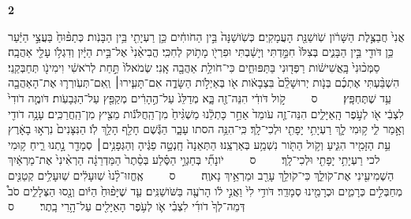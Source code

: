 \documentclass[a4paper]{article}
\newcommand{\rdrchap}[1]{\begin{english}\setRL\small\textbf{#1}\end{english}}
\newcommand{\rdrverse}[1]{\raisebox{2.5pt}{\smaller[4]#1}}
\newcommand{\setuma}{~~~~{\scriptsize ס}~~~~}
\begin{document}
\begin{hebrew}
\begin{multicols}{2}
\rdrchap{2}\rdrverse{1} אֲנִי֙ חֲבַצֶּ֣לֶת הַשָּׁרֹ֔ון שֹֽׁושַׁנַּ֖ת הָעֲמָקִֽים׃ 
\rdrverse{2} כְּשֹֽׁושַׁנָּה֙ בֵּ֣ין הַחֹוחִ֔ים כֵּ֥ן רַעְיָתִ֖י בֵּ֥ין הַבָּנֹֽות׃ 
\rdrverse{3} כְּתַפּ֨וּחַ֙ בַּעֲצֵ֣י הַיַּ֔עַר כֵּ֥ן דֹּודִ֖י בֵּ֣ין הַבָּנִ֑ים בְּצִלֹּו֙ חִמַּ֣דְתִּי וְיָשַׁ֔בְתִּי וּפִרְיֹ֖ו מָתֹ֥וק לְחִכִּֽי׃ 
\rdrverse{4} הֱבִיאַ֨נִי֙ אֶל־בֵּ֣ית הַיָּ֔יִן וְדִגְלֹ֥ו עָלַ֖י אַהֲבָֽה׃ 
\rdrverse{5} סַמְּכ֨וּנִי֙ בָּֽאֲשִׁישֹׁ֔ות רַפְּד֖וּנִי בַּתַּפּוּחִ֑ים כִּי־חֹולַ֥ת אַהֲבָ֖ה אָֽנִי׃ 
\rdrverse{6} שְׂמֹאלֹו֙ תַּ֣חַת לְרֹאשִׁ֔י וִימִינֹ֖ו תְּחַבְּקֵֽנִי׃ 
\rdrverse{7} הִשְׁבַּ֨עְתִּי אֶתְכֶ֜ם בְּנֹ֤ות יְרוּשָׁלִַ֨ם֙ בִּצְבָאֹ֔ות אֹ֖ו בְּאַיְלֹ֣ות הַשָּׂדֶ֑ה אִם־תָּעִ֧ירוּ׀ וְֽאִם־תְּעֹֽורְר֛וּ אֶת־הָאַהֲבָ֖ה עַ֥ד שֶׁתֶּחְפָּֽץ׃ \setuma{} 
\rdrverse{8} קֹ֣ול דֹּודִ֔י הִנֵּה־זֶ֖ה בָּ֑א מְדַלֵּג֙ עַל־הֶ֣הָרִ֔ים מְקַפֵּ֖ץ עַל־הַגְּבָעֹֽות׃ 
\rdrverse{9} דֹּומֶ֤ה דֹודִי֙ לִצְבִ֔י אֹ֖ו לְעֹ֣פֶר הָֽאַיָּלִ֑ים הִנֵּה־זֶ֤ה עֹומֵד֙ אַחַ֣ר כָּתְלֵ֔נוּ מַשְׁגִּ֨יחַ֙ מִן־הַֽחֲלֹּנֹ֔ות מֵצִ֖יץ מִן־הַֽחֲרַכִּֽים׃ 
\rdrverse{10} עָנָ֥ה דֹודִ֖י וְאָ֣מַר לִ֑י ק֥וּמִי לָ֛ךְ רַעְיָתִ֥י יָפָתִ֖י וּלְכִי־לָֽךְ׃ 
\rdrverse{11} כִּֽי־הִנֵּ֥ה הסתו עָבָ֑ר הַגֶּ֕שֶׁם חָלַ֖ף הָלַ֥ךְ לֹֽו׃ 
\rdrverse{12} הַנִּצָּנִים֙ נִרְא֣וּ בָאָ֔רֶץ עֵ֥ת הַזָּמִ֖יר הִגִּ֑יעַ וְקֹ֥ול הַתֹּ֖ור נִשְׁמַ֥ע בְּאַרְצֵֽנוּ׃ 
\rdrverse{13} הַתְּאֵנָה֙ חָֽנְטָ֣ה פַגֶּ֔יהָ וְהַגְּפָנִ֥ים׀ סְמָדַ֖ר נָ֣תְנוּ רֵ֑יחַ ק֥וּמִי לכי רַעְיָתִ֥י יָפָתִ֖י וּלְכִי־לָֽךְ׃ \setuma{} 
\rdrverse{14} יֹונָתִ֞י בְּחַגְוֵ֣י הַסֶּ֗לַע בְּסֵ֨תֶר֙ הַמַּדְרֵגָ֔ה הַרְאִ֨ינִי֙ אֶת־מַרְאַ֔יִךְ הַשְׁמִיעִ֖ינִי אֶת־קֹולֵ֑ךְ כִּי־קֹולֵ֥ךְ עָרֵ֖ב וּמַרְאֵ֥יךְ נָאוֶֽה׃ \setuma{} 
\rdrverse{15} אֶֽחֱזוּ־לָ֨נוּ֙ שֽׁוּעָלִ֔ים שֽׁוּעָלִ֥ים קְטַנִּ֖ים מְחַבְּלִ֣ים כְּרָמִ֑ים וּכְרָמֵ֖ינוּ סְמָדַֽר׃ 
\rdrverse{16} דֹּודִ֥י לִי֙ וַאֲנִ֣י לֹ֔ו הָרֹעֶ֖ה בַּשֹּׁושַׁנִּֽים׃ 
\rdrverse{17} עַ֤ד שֶׁיָּפ֨וּחַ֙ הַיֹּ֔ום וְנָ֖סוּ הַצְּלָלִ֑ים סֹב֩ דְּמֵה־לְךָ֙ דֹודִ֜י לִצְבִ֗י אֹ֛ו לְעֹ֥פֶר הָאַיָּלִ֖ים עַל־הָ֥רֵי בָֽתֶר׃ \setuma{} 



\end{multicols}
\end{hebrew}
\end{document}
